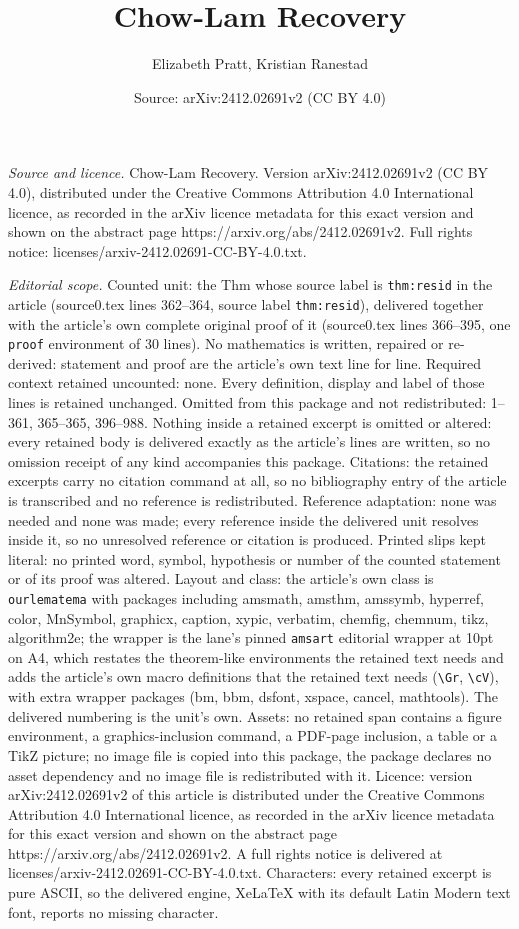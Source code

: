 \documentclass[10pt,a4paper]{amsart}
\title[Chow-Lam Recovery]{Chow-Lam Recovery}
\author{Elizabeth Pratt, Kristian Ranestad}
\date{Source: arXiv:2412.02691v2 (CC BY 4.0)}
\begin{document}
\maketitle

\noindent\emph{Source and licence.} Chow-Lam Recovery. Version arXiv:2412.02691v2 (CC BY 4.0), distributed under the Creative Commons Attribution 4.0 International licence, as recorded in the arXiv licence metadata for this exact version and shown on the abstract page https://arxiv.org/abs/2412.02691v2. Full rights notice: licenses/arxiv-2412.02691-CC-BY-4.0.txt.\par\smallskip

\noindent\textit{Editorial scope.} Counted unit: the Thm whose source label is \texttt{thm:resid} in the article (source0.tex lines 362--364, source label \texttt{thm:resid}), delivered together with the article's own complete original proof of it (source0.tex lines 366--395, one \texttt{proof} environment of 30 lines). No mathematics is written, repaired or re-derived: statement and proof are the article's own text line for line. Required context retained uncounted: none. Every definition, display and label of those lines is retained unchanged. Omitted from this package and not redistributed: 1--361, 365--365, 396--988. Nothing inside a retained excerpt is omitted or altered: every retained body is delivered exactly as the article's lines are written, so no omission receipt of any kind accompanies this package. Citations: the retained excerpts carry no citation command at all, so no bibliography entry of the article is transcribed and no reference is redistributed. Reference adaptation: none was needed and none was made; every reference inside the delivered unit resolves inside it, so no unresolved reference or citation is produced. Printed slips kept literal: no printed word, symbol, hypothesis or number of the counted statement or of its proof was altered. Layout and class: the article's own class is \texttt{ourlematema} with packages including amsmath, amsthm, amssymb, hyperref, color, MnSymbol, graphicx, caption, xypic, verbatim, chemfig, chemnum, tikz, algorithm2e; the wrapper is the lane's pinned \texttt{amsart} editorial wrapper at 10pt on A4, which restates the theorem-like environments the retained text needs and adds the article's own macro definitions that the retained text needs (\texttt{\textbackslash Gr}, \texttt{\textbackslash cV}), with extra wrapper packages (bm, bbm, dsfont, xspace, cancel, mathtools). The delivered numbering is the unit's own. Assets: no retained span contains a figure environment, a graphics-inclusion command, a PDF-page inclusion, a table or a TikZ picture; no image file is copied into this package, the package declares no asset dependency and no image file is redistributed with it. Licence: version arXiv:2412.02691v2 of this article is distributed under the Creative Commons Attribution 4.0 International licence, as recorded in the arXiv licence metadata for this exact version and shown on the abstract page https://arxiv.org/abs/2412.02691v2. A full rights notice is delivered at licenses/arxiv-2412.02691-CC-BY-4.0.txt. Characters: every retained excerpt is pure ASCII, so the delivered engine, XeLaTeX with its default Latin Modern text font, reports no missing character.
\end{document}
